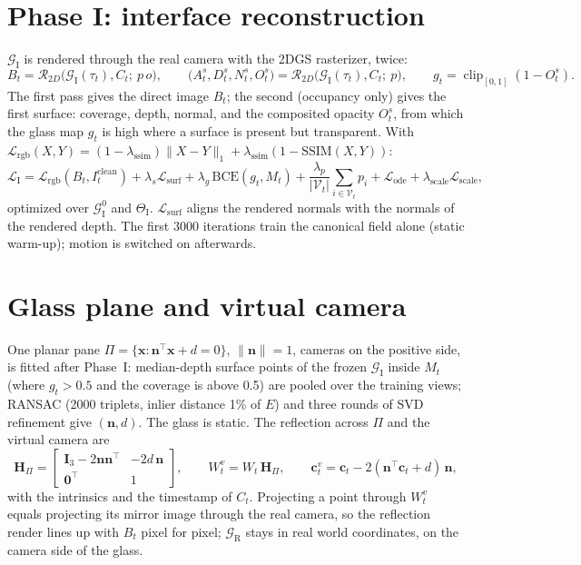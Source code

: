 \documentclass[10pt,a4paper]{article}
\newcommand{\GI}{\mathcal G_{\mathrm I}}
\newcommand{\GR}{\mathcal G_{\mathrm R}}
\newcommand{\nn}{\mathbf n}
\newcommand{\cc}{\mathbf c}
\begin{document}
\section{Phase I: interface reconstruction}
$\GI$ is rendered through the real camera with the 2DGS rasterizer, twice:
\begin{equation}
B_t=\mathcal R_{2D}\big(\GI(\tau_t),C_t;\ p\,o\big),\qquad \big(A^s_t,D^s_t,N^s_t,O^s_t\big)=\mathcal R_{2D}\big(\GI(\tau_t),C_t;\ p\big),\qquad g_t=\operatorname{clip}_{[0,1]}(1-O^s_t).
\end{equation}
The first pass gives the direct image $B_t$; the second (occupancy only) gives the first surface: coverage, depth, normal, and the composited opacity $O^s_t$, from which the glass map $g_t$ is high where a surface is present but transparent. With $\mathcal L_{\mathrm{rgb}}(X,Y)=(1-\lambda_{\mathrm{ssim}})\|X-Y\|_1+\lambda_{\mathrm{ssim}}(1-\mathrm{SSIM}(X,Y))$:
\begin{equation}
\mathcal L_{\mathrm I}=\mathcal L_{\mathrm{rgb}}(B_t,I_t^{\mathrm{clean}})+\lambda_s\mathcal L_{\mathrm{surf}}+\lambda_g\,\mathrm{BCE}(g_t,M_t)+\frac{\lambda_p}{|\mathcal V_t|}\sum_{i\in\mathcal V_t}p_i+\mathcal L_{\mathrm{ode}}+\lambda_{\mathrm{scale}}\mathcal L_{\mathrm{scale}},
\end{equation}
optimized over $\GI^0$ and $\Theta_{\mathrm I}$. $\mathcal L_{\mathrm{surf}}$ aligns the rendered normals with the normals of the rendered depth. The first 3000 iterations train the canonical field alone (static warm-up); motion is switched on afterwards.

\section{Glass plane and virtual camera}
One planar pane $\Pi=\{\mathbf x:\nn^\top\mathbf x+d=0\}$, $\|\nn\|=1$, cameras on the positive side, is fitted after Phase~I: median-depth surface points of the frozen $\GI$ inside $M_t$ (where $g_t>0.5$ and the coverage is above 0.5) are pooled over the training views; RANSAC (2000 triplets, inlier distance 1\% of $E$) and three rounds of SVD refinement give $(\nn,d)$. The glass is static. The reflection across $\Pi$ and the virtual camera are
\begin{equation}
\mathbf H_\Pi=\begin{bmatrix}\mathbf I_3-2\nn\nn^\top&-2d\,\nn\\\mathbf 0^\top&1\end{bmatrix},\qquad W_t^{v}=W_t\,\mathbf H_\Pi,\qquad \cc_t^{v}=\cc_t-2(\nn^\top\cc_t+d)\,\nn,
\end{equation}
with the intrinsics and the timestamp of $C_t$. Projecting a point through $W_t^v$ equals projecting its mirror image through the real camera, so the reflection render lines up with $B_t$ pixel for pixel; $\GR$ stays in real world coordinates, on the camera side of the glass.
\end{document}
